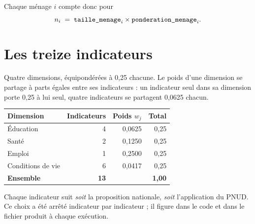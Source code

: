 \documentclass[11pt,a4paper]{article}
\begin{document}
Chaque ménage $i$ compte donc pour
\[
n_i \;=\; \texttt{taille\_menage}_i \times \texttt{ponderation\_menage}_i .
\]

\section{Les treize indicateurs}

Quatre dimensions, équipondérées à 0,25 chacune. Le poids d'une dimension se partage à parts
égales entre ses indicateurs : un indicateur seul dans sa dimension porte 0,25 à lui seul, quatre
indicateurs se partagent 0,0625 chacun.

\begin{center}
\begin{tabular}{@{}lrrr@{}}
\toprule
\textbf{Dimension} & \textbf{Indicateurs} & \textbf{Poids $w_j$} & \textbf{Total} \\
\midrule
Éducation & 4 & 0,0625 & 0,25 \\
Santé & 2 & 0,1250 & 0,25 \\
Emploi & 1 & 0,2500 & 0,25 \\
Conditions de vie & 6 & 0,0417 & 0,25 \\
\midrule
\textbf{Ensemble} & \textbf{13} & & \textbf{1,00} \\
\bottomrule
\end{tabular}
\end{center}

Chaque indicateur suit \emph{soit} la proposition nationale, \emph{soit} l'application du PNUD.
Ce choix a été arrêté indicateur par indicateur ; il figure dans le code et dans le fichier
 produit à chaque exécution.
\end{document}

